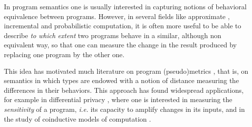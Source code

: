 
In program semantics one is usually interested in capturing notions of behavioral equivalence between programs. However,  
in several fields like approximate \cite{Mittal2016}, incremental \cite{Cai2014, Picallo2019} and probabilistic \cite{10.1109/LICS.2015.64} computation, it is often more useful to be able to describe \emph{to which extent}  two programs behave in a similar, although non equivalent way, so that one can measure the change in the result produced by
replacing one program by the other one.



This idea has motivated much literature on program (pseudo)metrics \cite{ARNOLD1980181, VANBREUGEL20011,Azevedo_de_Amorim_2017, Escardo1999, BAIER1994171,10.1109/LICS.2015.64, 10.1007/978-3-662-44584-6_4, 10.1007/978-3-662-54434-1_13, 10.1145/3209108.3209149}, that is, on semantics in which types are endowed with a notion of distance measuring the differences in their behaviors. This approach has found widespread applications, for example in differential privacy \cite{10.1145/1932681.1863568, 10.1007/978-3-642-29420-4_3, Barthe_2012}, where one is interested in measuring the \emph{sensitivity} of a program, \textit{i.e.} its capacity to amplify changes in its inputs, and in the study of coinductive models of computation \cite{DESHARNAIS2004323, VANBREUGEL2005115, 10.1007/978-3-662-44584-6_4,10.1007/3-540-48224-5_35}.
%

 
 
 
% 
% 
    
